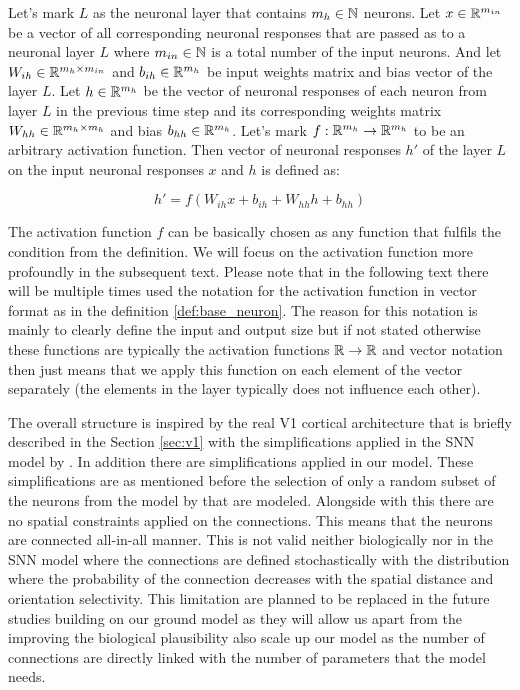\begin{defn}
    Let's mark $L$ as the neuronal layer that contains $m_{h} \in \mathbb{N}$ neurons. Let $x \in \mathbb{R}^{m_{in}}$ be a vector of all corresponding neuronal responses that are passed as to a neuronal layer $L$ where $m_{in} \in \mathbb{N}$ is a total number of the input neurons. And let $W_{ih} \in \mathbb{R}^{m_{h} \times m_{in}}$ and $b_{ih} \in \mathbb{R}^{m_{h}}$ be input weights matrix and bias vector of the layer $L$. Let $h \in \mathbb{R}^{m_h}$ be the vector of neuronal responses of each neuron from layer $L$ in the previous time step and its corresponding weights matrix $W_{hh} \in \mathbb{R}^{m_{h} \times m_{h}}$ and bias $b_{hh} \in \mathbb{R}^{m_h}$. Let's mark $f: \mathbb{R}^{m_h} \to \mathbb{R}^{m_h}$ to be an arbitrary activation function. Then vector of neuronal responses $h'$ of the layer $L$ on the input neuronal responses $x$ and $h$ is defined as:

    $$h' = f\left(W_{ih}x + b_{ih} + W_{hh}h + b_{hh}\right)$$
\end{defn}
\label{def:base_neuron}

The activation function $f$ can be basically chosen as any function that fulfils the condition from the definition. We will focus on the activation function more profoundly in the subsequent text. Please note that in the following text there will be multiple times used the notation for the activation function in vector format as in the definition \ref{def:base_neuron}. The reason for this notation is mainly to clearly define the input and output size but if not stated otherwise these functions are typically the activation functions $\mathbb{R} \to \mathbb{R}$ and vector notation then just means that we apply this function on each element of the vector separately (the elements in the layer typically does not influence each other).

The overall structure is inspired by the real V1 cortical architecture that is briefly described in the Section \ref{sec:v1} with the simplifications applied in the SNN model by \citet{antolik2024comprehensive}. In addition there are simplifications applied in our model. These simplifications are as mentioned before the selection of only a random subset of the neurons from the model by \citet{antolik2024comprehensive} that are modeled. Alongside with this there are no spatial constraints applied on the connections. This means that the neurons are connected all-in-all manner. This is not valid neither biologically nor in the SNN model where the connections are defined stochastically with the distribution where the probability of the connection decreases with the spatial distance and orientation selectivity. This limitation are planned to be replaced in the future studies building on our ground model as they will allow us apart from the improving the biological plausibility also scale up our model as the number of connections are directly linked with the number of parameters that the model needs.

